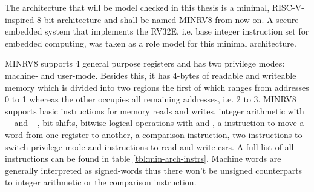 The architecture that will be model checked in this thesis is a minimal, RISC-V-inspired 8-bit architecture and shall be named MINRV8 from now on.
A secure embedded system that implements the RV32E, i.e. base integer instruction set for embedded computing, was taken as a role model for this minimal architecture.

MINRV8 supports 4 general purpose registers and has two privilege modes: machine- and user-mode.
Besides this, it has 4-bytes of readable and writeable memory which is divided into two regions the first of which ranges from addresses 0 to 1 whereas the other occupies all remaining addresses, i.e. 2 to 3.
MINRV8 supports basic instructions for memory reads and writes, integer arithmetic with $ + $ and $ - $, bit-shifts, bitwise-logical operations with  and , a  instruction to move a word from one register to another, a comparison instruction, two instructions to switch privilege mode and instructions to read and write \glspl{csr}.
A full list of all instructions can be found in table \ref{tbl:min-arch-instrs}.
Machine words are generally interpreted as signed-words thus there won't be unsigned counterparts to integer arithmetic or the comparison instruction.

